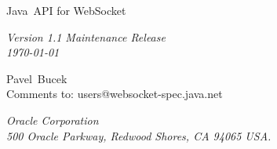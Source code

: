 \begin{titlepage}
\raggedleft

\vspace*{60pt}

{\Huge
\textsf{Java\texttrademark\ API for WebSocket
\vspace{10pt}}}

\vspace{20pt}

{
\Large\textit{Version 1.1 Maintenance Release \\
\today}
}

\vspace{40pt}

{\large Pavel\ Bucek\\
\vspace{10pt}Comments to: users@websocket-spec.java.net
}

\vspace{80pt}

{\small\textit{Oracle Corporation\\
500 Oracle Parkway, Redwood Shores, CA 94065 USA.}
}
\end{titlepage} 
